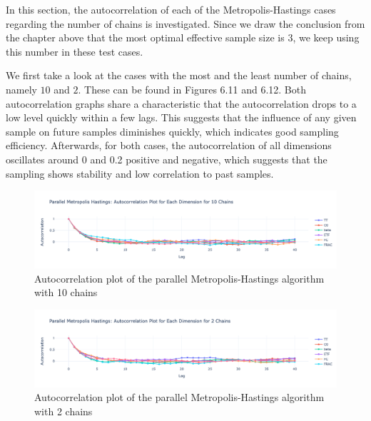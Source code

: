 In this section, the autocorrelation of each of the Metropolis-Hastings cases regarding the number of chains is investigated. Since we draw the conclusion from the chapter above that the most optimal effective sample size is $3$, we keep using this number in these test cases.

We first take a look at the cases with the most and the least number of chains, namely $10$ and $2$. These can be found in Figures 6.11 and 6.12. Both autocorrelation graphs share a characteristic that the autocorrelation drops to a low level quickly within a few lags. This suggests that the influence of any given sample on future samples diminishes quickly, which indicates good sampling efficiency. Afterwards, for both cases, the autocorrelation of all dimensions oscillates around 0 and 0.2 positive and negative, which suggests that the sampling shows stability and low correlation to past samples. 

\begin{figure}[H]
    \centering
    \includegraphics[width=1\textwidth]{figures/parallel_mh/Autocorrelation_10.png}
    \captionsetup{width=.8\textwidth}
    \caption{Autocorrelation plot of the parallel Metropolis-Hastings algorithm with 10 chains}
    \label{fig:enter-label}
\end{figure}


\begin{figure}[H]
    \centering
    \includegraphics[width=1\textwidth]{figures/parallel_mh/Autocorrelation_2.png}
    \captionsetup{width=.8\textwidth}
    \caption{Autocorrelation plot of the parallel Metropolis-Hastings algorithm with 2 chains}
    \label{fig:enter-label}
\end{figure}


